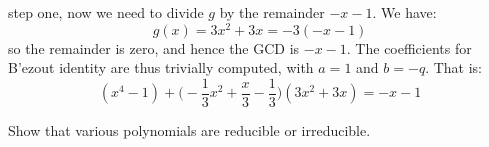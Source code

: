 \begin{solution}
        step one, now we need to divide $g$ by the remainder
        $\minus{x}-1$. We have:
        \begin{equation}
            g(x)=3x^{2}+3x=\minus{3}(\minus{x}-1)
        \end{equation}
        so the remainder is zero, and hence the GCD is $\minus{x}-1$. The
        coefficients for B'{e}zout identity are thus trivially computed,
        with $a=1$ and $b=\minus{q}$. That is:
        \begin{equation}
            (x^{4}-1)+
                \Big(\minus\frac{1}{3}x^{2}+\frac{x}{3}-\frac{1}{3}\Big)
                (3x^{2}+3x)=\minus{x}-1
        \end{equation}
    \end{solution}
    \begin{problem}
        Show that various polynomials are reducible or irreducible.
    \end{problem}
